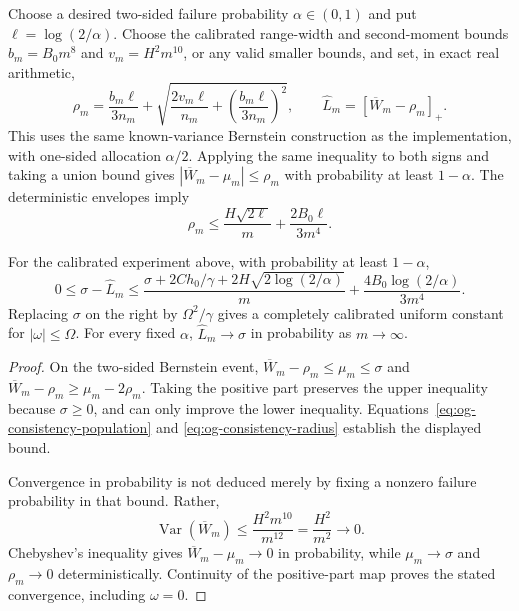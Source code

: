 Choose a desired two-sided failure probability $\alpha\in(0,1)$ and put
$\ell=\log(2/\alpha)$. Choose the calibrated range-width and
second-moment bounds $b_m=B_0m^8$ and $v_m=H^2m^{10}$, or any valid
smaller bounds, and set, in exact real arithmetic,
\begin{equation}
 \rho_m=\frac{b_m\ell}{3n_m}
 +\sqrt{\frac{2v_m\ell}{n_m}
        +\left(\frac{b_m\ell}{3n_m}\right)^2},
 \qquad
 \widehat L_m=[\overline W_m-\rho_m]_+.
 \label{eq:og-consistency-estimator}
\end{equation}
This uses the same known-variance Bernstein construction as the implementation, with
one-sided allocation $\alpha/2$. Applying the same inequality to both signs
and taking a union bound gives
$|\overline W_m-\mu_m|\leq\rho_m$ with probability at least $1-\alpha$.
The deterministic envelopes imply
\begin{equation}
 \rho_m\leq
 \frac{H\sqrt{2\ell}}{m}
 +\frac{2B_0\ell}{3m^4}.
 \label{eq:og-consistency-radius}
\end{equation}

\begin{theorem}
\label{thm:og-consistency}
For the calibrated experiment above, with probability at least $1-\alpha$,
\begin{equation}
 \boxed{\displaystyle
 0\leq\sigma-\widehat L_m
 \leq
 \frac{\sigma+2Ch_0/\gamma+2H\sqrt{2\log(2/\alpha)}}{m}
 +\frac{4B_0\log(2/\alpha)}{3m^4}.}
 \label{eq:og-consistency-main}
\end{equation}
Replacing $\sigma$ on the right by $\Omega^2/\gamma$ gives a completely
calibrated uniform constant for $|\omega|\leq\Omega$.
For every fixed $\alpha$, $\widehat L_m\to\sigma$ in probability as
$m\to\infty$.
\end{theorem}

\begin{proof}
On the two-sided Bernstein event,
$\overline W_m-\rho_m\leq\mu_m\leq\sigma$ and
$\overline W_m-\rho_m\geq\mu_m-2\rho_m$. Taking the positive part
preserves the upper inequality because $\sigma\geq0$, and can only improve
the lower inequality. Equations~\eqref{eq:og-consistency-population} and
\eqref{eq:og-consistency-radius} establish the displayed bound.

Convergence in probability is not deduced merely by fixing a nonzero
failure probability in that bound. Rather,
\[
 \operatorname{Var}(\overline W_m)
 \leq\frac{H^2m^{10}}{m^{12}}=\frac{H^2}{m^2}\longrightarrow0.
\]
Chebyshev's inequality gives
$\overline W_m-\mu_m\to0$ in probability, while
$\mu_m\to\sigma$ and $\rho_m\to0$ deterministically. Continuity of
the positive-part map proves the stated convergence, including $\omega=0$.
\end{proof}

